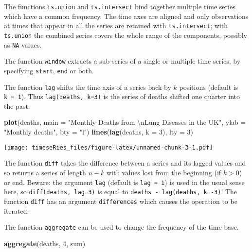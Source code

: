 \documentclass[]{book}
\newenvironment{Shaded}{\begin{snugshade}}{\end{snugshade}}
\newcommand{\CharTok}[1]{\textcolor[rgb]{0.31,0.60,0.02}{#1}}
\newcommand{\DataTypeTok}[1]{\textcolor[rgb]{0.13,0.29,0.53}{#1}}
\newcommand{\DecValTok}[1]{\textcolor[rgb]{0.00,0.00,0.81}{#1}}
\newcommand{\KeywordTok}[1]{\textcolor[rgb]{0.13,0.29,0.53}{\textbf{#1}}}
\newcommand{\NormalTok}[1]{#1}
\newcommand{\StringTok}[1]{\textcolor[rgb]{0.31,0.60,0.02}{#1}}
\begin{document}
The functions \texttt{ts.union} and \texttt{ts.intersect} bind together
multiple time series which have a common frequency. The time axes are
aligned and only observations at times that appear in all the series are
retained with \texttt{ts.intersect}; with \texttt{ts.union} the combined
series covers the whole range of the components, possibly as \texttt{NA}
values.

The function \texttt{window} extracts a sub-series of a single or
multiple time series, by specifying \texttt{start}, \texttt{end} or
both.

The function \texttt{lag} shifts the time axis of a series back by \(k\)
positions (default is \texttt{k\ =\ 1}). Thus \texttt{lag(deaths,\ k=3)}
is the series of deaths shifted one quarter into the past.

\begin{Shaded}
\begin{Highlighting}[]
\KeywordTok{plot}\NormalTok{(deaths, }\DataTypeTok{main =} \StringTok{"Monthly Deaths from }\CharTok{\textbackslash{}n}\StringTok{Lung Diseases in the UK"}\NormalTok{, }\DataTypeTok{ylab =} \StringTok{"Monthly deaths"}\NormalTok{, }
    \DataTypeTok{bty =} \StringTok{"l"}\NormalTok{)}
\KeywordTok{lines}\NormalTok{(}\KeywordTok{lag}\NormalTok{(deaths, }\DataTypeTok{k =} \DecValTok{3}\NormalTok{), }\DataTypeTok{lty =} \DecValTok{3}\NormalTok{)}
\end{Highlighting}
\end{Shaded}

\texttt{[image: timeseRies\_files/figure-latex/unnamed-chunk-3-1.pdf]}

The function \texttt{diff} takes the difference between a series and its
lagged values and so returns a series of length \(n-k\) with values lost
from the beginning (if \(k>0\)) or end. Beware: the argument
\texttt{lag} (default is \texttt{lag\ =\ 1}) is used in the usual sense
here, so \texttt{diff(deaths,\ lag=3)} is equal to
\texttt{deaths\ -\ lag(deaths,\ k=-3)}! The function \texttt{diff} has
an argument \texttt{differences} which causes the operation to be
iterated.

The function \texttt{aggregate} can be used to change the frequency of
the time base.

\begin{Shaded}
\begin{Highlighting}[]
\KeywordTok{aggregate}\NormalTok{(deaths, }\DecValTok{4}\NormalTok{, sum)}
\end{Highlighting}
\end{Shaded}
\end{document}
